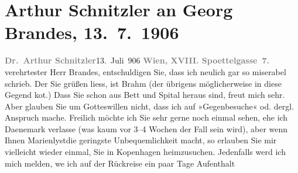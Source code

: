 

         
         \renewcommand{\erwaehntePersonen}{Personen: Otto Brahm, Georg Brandes}
         \renewcommand{\erwaehnteOrte}{Orte: Dänemark, Edmund-Weiß-Gasse, Kopenhagen, Marienlyst, Schweden, Skodsborg}
         \renewcommand{\erwaehnteWerke}{}
               \section[Arthur Schnitzler an Georg Brandes, 13. 7. 1906]{ Arthur Schnitzler an Georg Brandes, 13. 7. 1906}\nopagebreak{}\rehead{ }\begin{ledgroupsized}[t]{13cm}\normalsize\beginnumbering \toendnotes[C]{\smallbreak\pagebreak[2]} 
\pstart
           \noindent{}{\pb}\textcolor{gray}{\textbf{Dr. Arthur Schnitzler}}\hfill 13. Juli 906\pend
           \pstart
           \textcolor{gray}{\textbf{Wien, XVIII. Spoettelgasse 7.}}\pend
           \pstart{}verehrtester Herr Brandes,\pend\pstart
           entschuldigen Sie, dass ich neulich gar so miserabel schrieb. Der Sie grüßen
                    liess, ist Brahm (der übrigens
                    möglicherweise in diese Gegend ko{\geminationm}t.) Dass Sie
                    schon aus Bett und Spital heraus sind, freut mich sehr. Aber glauben Sie um
                    Gotteswillen nicht, dass ich auf »Gegenbesuche« od. dergl. Anspruch mache.
                    Freilich möchte ich Sie sehr gerne noch einmal sehen, ehe ich Daenemark verlasse (was kaum vor 3–4 Wochen der Fall sein
                    wird), aber wenn Ihnen Marienlystdie geringste Unbequemlichkeit macht, so
                    erlauben Sie mir vielleicht wieder einmal, Sie in Kopenhagen heimzusuchen. Jedenfalls werd ich mich melden, we{\geminationn} ich auf der Rückreise ein paar Tage Aufenthalt

\end{ledgroupsized}
